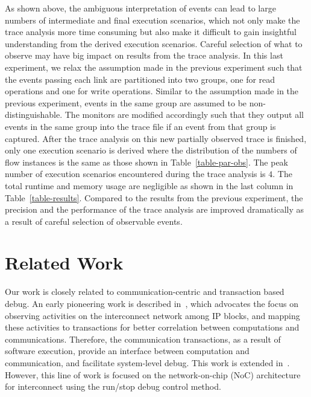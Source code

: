 \documentclass[conference]{IEEEtran}
\begin{document}
As shown above, the ambiguous interpretation of events can lead to large numbers of intermediate and final execution scenarios, which not only make the trace analysis more time consuming but also make it difficult to gain insightful understanding from the derived execution scenarios.  Careful selection of what to observe may have big impact on results from the trace analysis.  In this last experiment, we relax the assumption made in the previous experiment such that the events passing each link are partitioned into two groups, one for read operations and one for write operations.  Similar to the assumption made in the previous experiment, events in the same group are assumed to be non-distinguishable.  The monitors are modified accordingly such that they output all events in the same group into the trace file if an event from that group is captured.  After the trace analysis on this new partially observed trace is finished, only one execution scenario is derived where the distribution of the numbers of flow instances is the same as those shown in Table~\ref{table-par-obs}.  The peak number of execution scenarios encountered during the trace analysis is $4$.  The total runtime and memory usage are negligible as shown in the last column in Table~\ref{table-results}.  Compared to the results from the previous experiment, the precision and the performance of the trace analysis are improved dramatically as a result of careful selection of observable events. 

\section{Related Work}

Our work is closely related to communication-centric and transaction based debug.  An early pioneering work is described in~\cite{Goossens2007NOCS}, which advocates the focus on observing activities on the interconnect network among IP blocks, and mapping these activities to transactions for better correlation between computations and communications.  Therefore, the communication transactions, as a result of software execution, provide an interface between computation and communication, and facilitate  system-level debug.  This work is extended in~\cite{Vermeulen2009VLSI-DAT,Goossens2009DATE}.  However, this line of work is focused on the network-on-chip (NoC) architecture for interconnect using the run/stop debug control method.  
\end{document}
